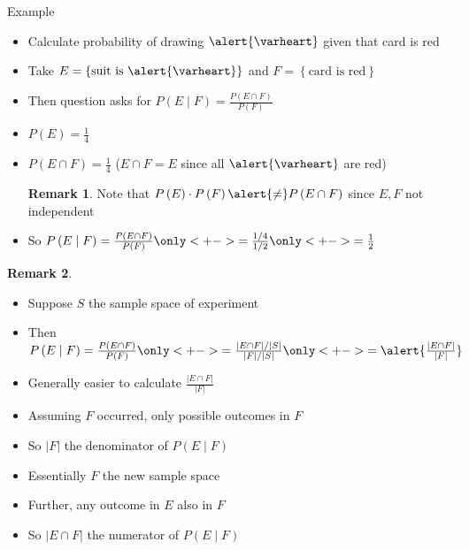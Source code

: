 \documentclass[handout]{beamer}
\theoremstyle{definition}
\newtheorem{remark}{Remark}
\begin{document}
\begin{frame}{Example}
\begin{itemize}
\item Calculate probability of drawing $\alert{\varheart}$ given
that card is red
\item Take $E=\left\{\text{suit is $\alert{\varheart}$}\right\}$
and $F=\left\{\text{card is red}\right\}$
\item Then question asks for $P\left(E\mid F\right)
=\frac{P\left(E\cap F\right)}{P\left(F\right)}$
\item $P\left(E\right)=\frac{1}{4}$\qquad
{}
\item $P\left(E\cap F\right)=\frac{1}{4}$\qquad
($E\cap F=E$ since all $\alert{\varheart}$ are red)
\begin{remark}
Note that $P\left(E\right)\cdot P\left(F\right)\alert{\ne}
P\left(E\cap F\right)$
since $E,F$ not independent
\end{remark}
\item So $P\left(E\mid F\right)
=\frac{P\left(E\cap F\right)}{P\left(F\right)}
\only<+->{=\frac{1/4}{1/2}}
\only<+->{=\frac{1}{2}}$
\end{itemize}
\end{frame}

\begin{frame}
\begin{remark}
\begin{itemize}
\item Suppose $S$ the sample space of experiment
\item Then
$P\left(E\mid F\right)=\frac{P\left(E\cap F\right)}{P\left(F\right)}
\only<+->{=\frac{\left|E\cap F\right|/\left|S\right|}
{\left|F\right|/\left|S\right|}}
\only<+->{=\alert{\frac{\left|E\cap F\right|}{\left|F\right|}}}$
\item Generally easier to calculate
$\frac{\left|E\cap F\right|}{\left|F\right|}$
\item Assuming $F$ occurred, only possible outcomes in $F$
\item So $\left|F\right|$ the denominator of $P\left(E\mid F\right)$
\item Essentially $F$ the \alert{new sample space}
\item Further, any outcome in $E$
also in $F$
\item So $\left|E\cap F\right|$ the numerator of
$P\left(E\mid F\right)$
\end{itemize}
\end{remark}
\end{frame}
\end{document}
